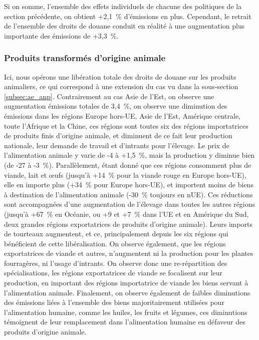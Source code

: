Si on somme, l'ensemble des effets individuels de chacune des politiques de la section précédente, on obtient +2,1~\% d'émissions en plus. Cependant, le retrait de l'ensemble des droits de douane conduit en réalité à une augmentation plus importante des émissions de +3,3~\%.


\subsubsection{Produits transformés d'origine animale}

Ici, nous opérons une libération totale des droits de douane sur les produits animaliers, ce qui correspond à une extension du cas vu dans la sous-section \ref{subsec:ae_anp}. Contrairement au cas Asie de l'Est, on observe une augmentation émissions totales de 3,4~\%, on observe une diminution des émissions dans les régions Europe hors-UE, Asie de l'Est, Amérique centrale, toute l'Afrique et la Chine, ces régions sont toutes six des régions importatrices de produits finis d'origine animale, et diminuent de ce fait leur production nationale, leur demande de travail et d'intrants pour l'élevage. Le prix de l'alimentation animale y varie de -4 à +1,5~\%, mais la production y diminue bien (de -27 à -3~\%). Parallèlement, étant donné que ces régions consomment plus de viande, lait et œufs (jusqu'à +14~\% pour la viande rouge en Europe hors-UE), elle en importe plus (+34~\% pour Europe hors-UE), et importent moins de biens à destination de l'alimentation animale (-30~\% toujours en nUE). Ces réductions sont accompagnées d'une augmentation de l'élevage dans toutes les autres régions (jusqu'à +67~\% en Océanie, ou +9 et +7~\% dans l'UE et en Amérique du Sud, deux grandes régions exportatrices de produits d'origine animale). Leurs imports de tourteaux augmentent, et ce, principalement depuis les six régions qui bénéficient de cette libéralisation. On observe également, que les régions exportatrices de viande et autres, n'augmentent ni la production pour les plantes fourragères, ni l'usage d'intrants. On observe donc une re-répartition des spécialisations, les régions exportatrices de viande se focalisent sur leur production, en important des régions importatrice de viande les biens servant à l'alimentation animale. Finalement, on observe également de faibles diminutions des émissions liées à l'ensemble des biens majoritairement utilisées pour l'alimentation humaine, comme les huiles, les fruits et légumes, ces diminutions témoignent de leur remplacement dans l'alimentation humaine en défaveur des produits d'origine animale.

